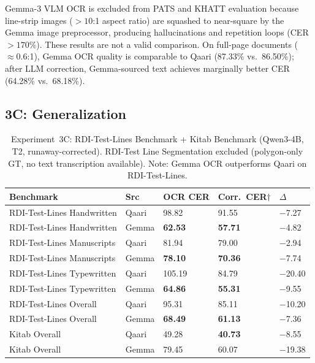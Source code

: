 Gemma-3 VLM OCR is excluded from PATS and KHATT evaluation because
line-strip images ($>10$:1 aspect ratio) are squashed to near-square by
the Gemma image preprocessor, producing hallucinations and repetition
loops (CER $>170\%$). These results are not a valid comparison.
On full-page documents ($\approx 0.6$:1), Gemma OCR quality is comparable
to Qaari (87.33\% vs.\ 86.50\%); after LLM correction, Gemma-sourced
text achieves marginally better CER (64.28\% vs.\ 68.18\%).

\subsection{3C: Generalization}
\label{subsec:res_exp3_gen}

\begin{table}[htbp]
  \centering
  \caption{Experiment~3C: RDI-Test-Lines Benchmark + Kitab Benchmark
           (Qwen3-4B, T2, runaway-corrected). RDI-Test Line Segmentation excluded
           (polygon-only GT, no text transcription available).
           Note: Gemma OCR outperforms Qaari on RDI-Test-Lines.}
  \label{tab:exp3_generalization}
  \begin{tabularx}{\textwidth}{llXXX}
    \toprule
    \textbf{Benchmark} & \textbf{Src} & \textbf{OCR CER} & \textbf{Corr.\ CER$\dagger$} & \textbf{$\Delta$} \\
    \midrule
    RDI-Test-Lines Handwritten & Qaari & 98.82 & 91.55 & $-$7.27 \\
    RDI-Test-Lines Handwritten & Gemma & \textbf{62.53} & \textbf{57.71} & $-$4.82 \\
    RDI-Test-Lines Manuscripts & Qaari & 81.94 & 79.00 & $-$2.94 \\
    RDI-Test-Lines Manuscripts & Gemma & \textbf{78.10} & \textbf{70.36} & $-$7.74 \\
    RDI-Test-Lines Typewritten & Qaari & 105.19 & 84.79 & $-$20.40 \\
    RDI-Test-Lines Typewritten & Gemma & \textbf{64.86} & \textbf{55.31} & $-$9.55 \\
    RDI-Test-Lines Overall & Qaari & 95.31 & 85.11 & $-$10.20 \\
    RDI-Test-Lines Overall & Gemma & \textbf{68.49} & \textbf{61.13} & $-$7.36 \\
    \midrule
    Kitab Overall & Qaari & 49.28 & \textbf{40.73} & $-$8.55 \\
    Kitab Overall & Gemma & 79.45 & 60.07 & $-$19.38 \\
    \bottomrule
  \end{tabularx}
\end{table}

